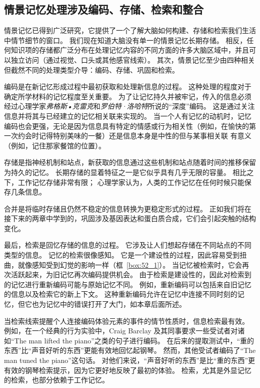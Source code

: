 \subsection{情景记忆处理涉及编码、存储、检索和整合}

情景记忆已得到广泛研究，它提供了一个了解大脑如何构建、存储和检索我们生活中情节细节的窗口。
我们现在知道大脑没有单一的情景记忆长期存储。
相反，任何知识项的存储都广泛分布在处理记忆内容的不同方面的许多大脑区域中，并且可以独立访问（通过视觉、口头或其他感官线索）。
其次，情景记忆至少由四种相关但截然不同的处理类型介导：编码、存储、巩固和检索。


编码是在新记忆形成过程中最初获取和处理新信息的过程。
这种处理的程度对于确定所学材料的记忆程度至关重要。
为了让记忆持久并被牢记，传入的信息必须经过心理学家\textit{弗格斯•克雷克}和\textit{罗伯特·洛哈特}所说的“深度”编码。
这是通过关注信息并将其与已经建立的记忆相关联来实现的。
当一个人有记忆的动机时，记忆编码也会更强，无论是因为信息具有特定的情感或行为相关性（例如，在愉快的第一次约会时记得特别美味的一餐）还是信息本身是中性的但与某事相关联 有意义（例如，记住那家餐馆的位置）。


存储是指神经机制和站点，新获取的信息通过这些机制和站点随着时间的推移保留为持久的记忆。
长期存储的显着特征之一是它似乎具有几乎无限的容量。
相比之下，工作记忆存储非常有限；
心理学家认为，人类的工作记忆在任何时候只能保存几条信息。


合并是将临时存储且仍然不稳定的信息转换为更稳定形式的过程。
正如我们将在接下来的两章中学到的，巩固涉及基因表达和蛋白质合成，它们会引起突触的结构变化。


最后，检索是回忆存储的信息的过程。
它涉及让人们想起存储在不同站点的不同类型的信息。
记忆的检索很像感知。
它是一个建设性的过程，因此容易受到扭曲，就像感知受到幻觉的影响一样（框~\ref{box:52_1}）。
当记忆被检索时，它会再次活跃起来，为旧记忆再次编码提供机会。
由于检索是建设性的，因此对检索到的记忆进行重新编码可能与原始记忆不同。
例如，重新编码可以包括来自旧记忆的信息以及检索它的新上下文。
这种重新编码允许在记忆中连接不同时刻的记忆，但它也为记忆中的错误打开了大门，如本章后面所述。


当检索线索提醒个人连接编码体验元素的事件的情节性质时，信息检索最有效。
例如，在一个经典的行为实验中，Craig Barclay 及其同事要求一些受试者对诸如“The man lifted the piano”之类的句子进行编码。
在后来的提取测试中，“重的东西”比“声音好听的东西”更能有效地回忆起钢琴。
然而，其他受试者编码了“The man tuned the piano”这句话。
对他们来说，“声音好听的东西”是比“重的东西”更有效的钢琴检索提示，因为它更好地反映了最初的体验。
检索，尤其是外显记忆的检索，也部分依赖于工作记忆。



